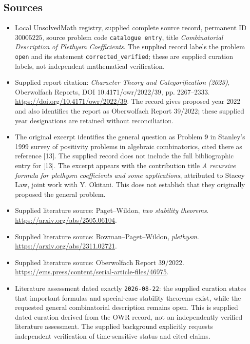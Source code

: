 \documentclass[11pt]{article}
\begin{document}
\subsection{Sources}
\begin{itemize}
\item Local UnsolvedMath registry, supplied complete source record, permanent ID \(30005225\), source problem code \texttt{catalogue entry}, title \emph{Combinatorial Description of Plethysm Coefficients}. The supplied record labels the problem \texttt{open} and its statement \texttt{corrected\_verified}; these are supplied curation labels, not independent mathematical verification.
\item Supplied report citation: \emph{Character Theory and Categorification (2023)}, Oberwolfach Reports, DOI 10.4171/owr/2022/39, pp. 2267--2333. \url{https://doi.org/10.4171/owr/2022/39}. The record gives proposed year 2022 and also identifies the report as Oberwolfach Report 39/2022; these supplied year designations are retained without reconciliation.
\item The original excerpt identifies the general question as Problem 9 in Stanley's 1999 survey of positivity problems in algebraic combinatorics, cited there as reference [13]. The supplied record does not include the full bibliographic entry for [13]. The excerpt appears with the contribution title \emph{A recursive formula for plethysm coefficients and some applications}, attributed to Stacey Law, joint work with Y. Okitani. This does not establish that they originally proposed the general problem.
\item Supplied literature source: Paget--Wildon, \emph{two stability theorems}. \url{https://arxiv.org/abs/2505.06104}.
\item Supplied literature source: Bowman--Paget--Wildon, \emph{plethysm}. \url{https://arxiv.org/abs/2311.02721}.
\item Supplied literature source: Oberwolfach Report 39/2022. \url{https://ems.press/content/serial-article-files/46975}.
\item Literature assessment dated exactly \texttt{2026-08-22}: the supplied curation states that important formulas and special-case stability theorems exist, while the requested general combinatorial description remains open. This is supplied dated curation derived from the OWR record, not an independently verified literature assessment. The supplied background explicitly requests independent verification of time-sensitive status and cited claims.
\end{itemize}
\end{document}
